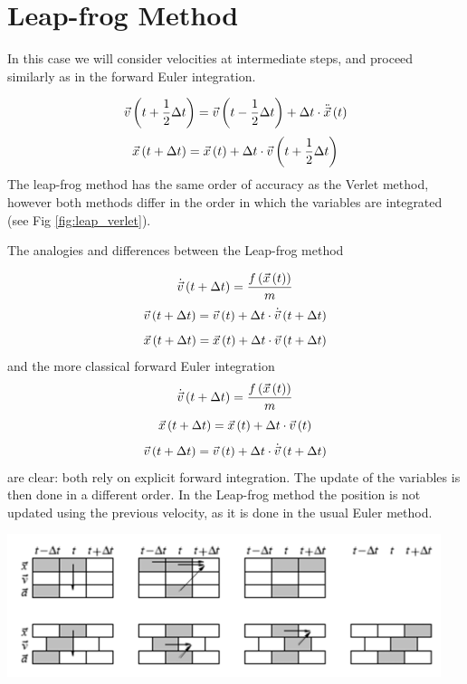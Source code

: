 \section{Leap-frog Method}


In this case we will consider velocities at intermediate steps, and proceed similarly as in the forward Euler integration. 

$$
\vec{v}\left(t+\frac{1}{2}\Delta t\right) =\vec{v}\left(t-\frac{1}{2}\Delta t\right)  + \Delta t \cdot \ddot{\vec{x}}\left(t\right)
$$
\begin{equation}
\vec{x}\left(t+\Delta t\right) =\vec{x}\left(t\right)  + \Delta t \cdot  \vec{v}\left(t+\frac{1}{2}\Delta t\right)
\label{eq:leap}
\end{equation}
The leap-frog method has the same order of accuracy as the Verlet method, however both methods differ in the order in which the variables are integrated (see Fig \ref{fig:leap_verlet}).

The analogies and differences between the Leap-frog method

$$
\dot{\vec{v}}\left(t+\Delta t\right) =\frac{f \left(\vec{x}\left(t\right)\right) }{m}
$$
$$
\vec{v}\left(t+\Delta t\right) = \vec{v}\left(t\right) + \Delta t  \cdot  \dot{\vec{v}}\left(t+\Delta t\right)
$$
$$
\vec{x}\left(t+\Delta t\right) = \vec{x}\left(t\right) + \Delta t  \cdot \vec{v}\left(t+\Delta t\right)
$$
and the more classical forward Euler integration
$$
\dot{\vec{v}}\left(t+\Delta t\right) =\frac{f \left(\vec{x}\left(t\right)\right) }{m}
$$
$$
\vec{x}\left(t+\Delta t\right) = \vec{x}\left(t\right) + \Delta t  \cdot \vec{v}\left(t\right)
$$
$$
\vec{v}\left(t+\Delta t\right) = \vec{v}\left(t\right) + \Delta t  \cdot \dot{\vec{v}}\left(t+\Delta t\right)
$$
are clear: both rely on explicit forward integration. The update of the variables is then done in a different order. In the Leap-frog method the position is not updated using the previous velocity, as it is done in the usual Euler method.



\vspace{0.1cm}
\noindent
\begin{minipage}{\textwidth}
\begin{minipage}{.98\textwidth}
  \centering
  \includegraphics[width=0.95\textwidth]{pics/leap_verlet}
  \label{fig:leap_verlet}
\end{minipage}
\end{minipage}
\vspace{0.1cm}

